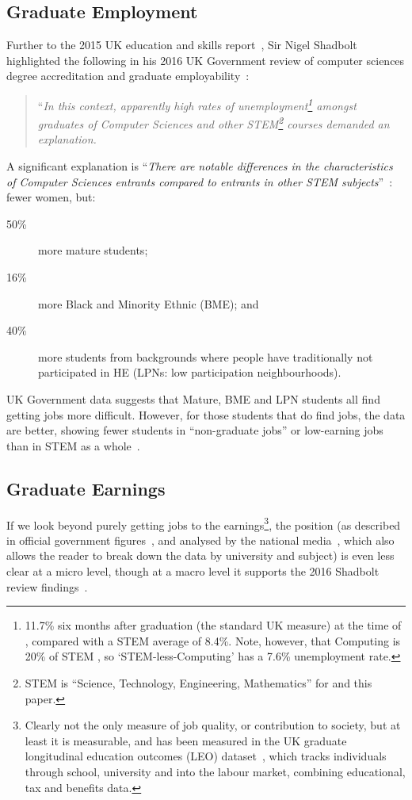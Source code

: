 \documentclass[conference]{IEEEtran}
\begin{document}
\subsection{Graduate Employment}

Further to the 2015 UK education and skills report~\cite{UKCES2015b},
Sir Nigel Shadbolt highlighted the following in his 2016 UK Government
review of computer sciences degree accreditation and graduate
employability~\cite{Shadbolt2016a}:

\begin{quote} ``{\emph{In this context, apparently high rates of
unemployment\footnote{11.7\% six months after graduation (the standard
UK measure) at the time of \cite{Shadbolt2016a}, compared with a STEM
average of 8.4\%. Note, however, that Computing is 20\% of STEM
\cite[Table 1]{Wakeham2016a}, so `STEM-less-Computing' has a 7.6\%
unemployment rate.} amongst graduates of Computer Sciences and other
STEM\footnote{STEM is ``Science, Technology, Engineering,
Mathematics'' for \cite{Shadbolt2016a} and this paper.} courses
demanded an explanation.}}
\end{quote}

A significant explanation is ``{\emph{There are notable differences in the
characteristics of Computer Sciences entrants compared to entrants in
other STEM subjects}}''~\cite[\P2.6]{Shadbolt2016a}: fewer women, but:

\begin{description}
\item[50\% ]more mature students;
\item[16\% ]more Black and Minority Ethnic (BME); and
\item[40\% ]more students from backgrounds where people have
traditionally not participated in HE (LPNs: low participation
neighbourhoods).
\end{description}

UK Government data suggests that Mature, BME and LPN students all find
getting jobs more difficult. However, for those students that do find
jobs, the data are better, showing fewer students in ``non-graduate
jobs'' or low-earning jobs than in STEM as a whole~\cite[Figure
6]{Shadbolt2016a}.

\subsection{Graduate Earnings}
If we look beyond purely getting jobs to the earnings\footnote{Clearly
not the only measure of job quality, or contribution to society, but
at least it is measurable, and has been measured in the UK graduate
longitudinal education outcomes (LEO) dataset~\cite{DfE2017a}, which
tracks individuals through school, university and into the labour
market, combining educational, tax and benefits data.}, the position
(as described in official government figures~\cite{DfE2018d}, and
analysed by the national media~\cite{BBC2018f}, which also allows the
reader to break down the data by university and subject) is even less
clear at a micro level, though at a macro level it
supports the 2016 Shadbolt review findings~\cite{Shadbolt2016a}.
\end{document}
